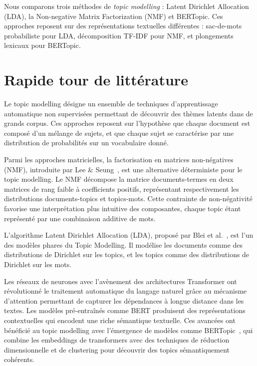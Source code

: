 \documentclass{article}
\begin{document}
Nous comparons trois méthodes de \textit{topic modelling} : Latent Dirichlet Allocation (LDA), la Non-negative Matrix Factorization (NMF) et BERTopic. Ces approches reposent sur des représentations textuelles différentes : sac-de-mots probabiliste pour LDA, décomposition TF-IDF pour NMF, et plongements lexicaux pour BERTopic.

\section{Rapide tour de littérature}


Le topic modelling désigne un ensemble de techniques d'apprentissage automatique non supervisées permettant de découvrir des thèmes latents dans de grands corpus. Ces approches reposent sur l'hypothèse que chaque document est composé d'un mélange de sujets, et que chaque sujet se caractérise par une distribution de probabilités sur un vocabulaire donné.

Parmi les approches matricielles, la factorisation en matrices non-négatives (NMF), introduite par Lee \& Seung~\cite{lee1999}, est une alternative déterministe pour le topic modelling. Le NMF décompose la matrice documents-termes en deux matrices de rang faible à coefficients positifs, représentant respectivement les distributions documents-topics et topics-mots. Cette contrainte de non-négativité favorise une interprétation plus intuitive des composantes, chaque topic étant représenté par une combinaison additive de mots.

L'algorithme Latent Dirichlet Allocation (LDA), proposé par Blei et al.~\cite{blei2003}, est l'un des modèles phares du Topic Modelling. Il modélise les documents comme des distributions de Dirichlet sur les topics, et les topics comme des distributions de Dirichlet sur les mots.

Les réseaux de neurones avec l'avènement des architectures Transformer ont révolutionné le traitement automatique du langage naturel grâce au mécanisme d'attention permettant de capturer les dépendances à longue distance dans les textes. Les modèles pré-entraînés comme BERT produisent des représentations contextuelles qui encodent une riche sémantique textuelle. Ces avancées ont bénéficié au topic modelling avec l'émergence de modèles comme BERTopic~\cite{grootendorst2022,bertopic_algo}, qui combine les embeddings de transformers avec des techniques de réduction dimensionnelle et de clustering pour découvrir des topics sémantiquement cohérents.
\end{document}

